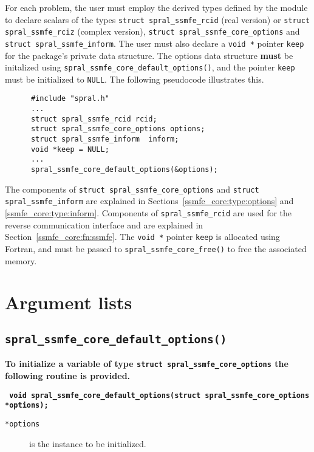 For each problem, the user must employ the derived types defined by the
module to declare scalars of the types 
{\tt struct spral\_ssmfe\_rcid} (real version) or 
{\tt struct spral\_ssmfe\_rciz} (complex version), 
{\tt struct spral\_ssmfe\_core\_options} and 
{\tt struct spral\_ssmfe\_inform}. The user must also declare a \texttt{void *}
pointer \texttt{keep} for the package's private data structure. The options
data structure \textbf{must} be initalized using \texttt{spral\_ssmfe\_core\_default\_options()},
and the pointer \texttt{keep} must be initialized to \texttt{NULL}.
The following pseudocode illustrates this.
\begin{verbatim}
      #include "spral.h"
      ...
      struct spral_ssmfe_rcid rcid;
      struct spral_ssmfe_core_options options;
      struct spral_ssmfe_inform  inform;
      void *keep = NULL;
      ...
      spral_ssmfe_core_default_options(&options);
\end{verbatim}
The components of {\tt struct spral\_ssmfe\_core\_options} and {\tt struct spral\_ssmfe\_inform} are explained
in Sections~\ref{ssmfe_core:type:options} and \ref{ssmfe_core:type:inform}. Components
of \texttt{spral\_ssmfe\_rcid} are used for the reverse communication interface and
are explained in Section~\ref{ssmfe_core:fn:ssmfe}.
The \texttt{void~*} pointer \texttt{keep} is allocated using Fortran, and
must be passed to \texttt{spral\_ssmfe\_core\_free()} to free the associated
memory.

\section{Argument lists}

\subsection{\texttt{spral\_ssmfe\_core\_default\_options()}}

\textbf{To initialize a variable of type \texttt{struct spral\_ssmfe\_core\_options}
the following routine is provided.}

\medskip
\noindent
\textbf{\texttt{
      \hspace*{0.3cm} void spral\_ssmfe\_core\_default\_options(struct spral\_ssmfe\_core\_options *options);
}}

\noindent
\begin{description}
   \item[\texttt{*options}] is the instance to be initialized.
\end{description}

